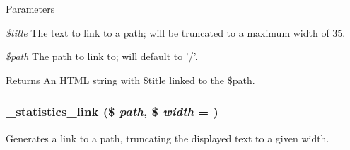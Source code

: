 \begin{DoxyParams}{Parameters}
\item[{\em \$title}]The text to link to a path; will be truncated to a maximum width of 35. \item[{\em \$path}]The path to link to; will default to '/'.\end{DoxyParams}
\begin{DoxyReturn}{Returns}
An HTML string with \$title linked to the \$path. 
\end{DoxyReturn}
\hypertarget{statistics_8module_a671374acaca873cc981716633107d664}{
\subsubsection[{\_\-statistics\_\-link}]{\setlength{\rightskip}{0pt plus 5cm}\_\-statistics\_\-link (\$ {\em path}, \/  \$ {\em width} = {})}}
\label{statistics_8module_a671374acaca873cc981716633107d664}
Generates a link to a path, truncating the displayed text to a given width.


